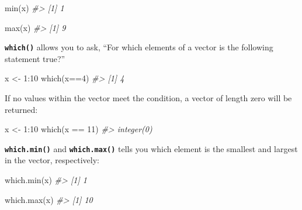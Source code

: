 \documentclass[
]{book}
\newenvironment{Shaded}{\begin{snugshade}}{\end{snugshade}}
\newcommand{\CommentTok}[1]{\textcolor[rgb]{0.56,0.35,0.01}{\textit{#1}}}
\newcommand{\DecValTok}[1]{\textcolor[rgb]{0.00,0.00,0.81}{#1}}
\newcommand{\FunctionTok}[1]{\textcolor[rgb]{0.00,0.00,0.00}{#1}}
\newcommand{\NormalTok}[1]{#1}
\newcommand{\OtherTok}[1]{\textcolor[rgb]{0.56,0.35,0.01}{#1}}
\newcommand{\SpecialCharTok}[1]{\textcolor[rgb]{0.00,0.00,0.00}{#1}}
\begin{document}
\begin{Shaded}
\begin{Highlighting}[]
\FunctionTok{min}\NormalTok{(x)}
\CommentTok{\#\textgreater{} [1] 1}
\end{Highlighting}
\end{Shaded}

\begin{Shaded}
\begin{Highlighting}[]
\FunctionTok{max}\NormalTok{(x)}
\CommentTok{\#\textgreater{} [1] 9}
\end{Highlighting}
\end{Shaded}

\textbf{\texttt{which()}} allows you to ask, ``For which elements of a vector is the following statement true?''

\begin{Shaded}
\begin{Highlighting}[]
\NormalTok{x }\OtherTok{\textless{}{-}} \DecValTok{1}\SpecialCharTok{:}\DecValTok{10}
\FunctionTok{which}\NormalTok{(x}\SpecialCharTok{==}\DecValTok{4}\NormalTok{)}
\CommentTok{\#\textgreater{} [1] 4}
\end{Highlighting}
\end{Shaded}

If no values within the vector meet the condition, a vector of length zero will be returned:

\begin{Shaded}
\begin{Highlighting}[]
\NormalTok{x }\OtherTok{\textless{}{-}} \DecValTok{1}\SpecialCharTok{:}\DecValTok{10}
\FunctionTok{which}\NormalTok{(x }\SpecialCharTok{==} \DecValTok{11}\NormalTok{)}
\CommentTok{\#\textgreater{} integer(0)}
\end{Highlighting}
\end{Shaded}

\textbf{\texttt{which.min()}} and \textbf{\texttt{which.max()}} tells you which element is the smallest and largest in the vector, respectively:

\begin{Shaded}
\begin{Highlighting}[]
\FunctionTok{which.min}\NormalTok{(x)}
\CommentTok{\#\textgreater{} [1] 1}
\end{Highlighting}
\end{Shaded}

\begin{Shaded}
\begin{Highlighting}[]
\FunctionTok{which.max}\NormalTok{(x)}
\CommentTok{\#\textgreater{} [1] 10}
\end{Highlighting}
\end{Shaded}
\end{document}
